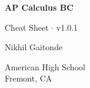 \documentclass[8pt,letter]{extarticle}     %
\theoremstyle{definition}
\theoremstyle{definition}
\theoremstyle{definition}
\begin{document}
\begin{titlepage}
    \begin{center}
		\vspace*{1cm}
		
		\Huge
        \textbf{AP Calculus BC}
        
		\vspace{0.5cm}
		\Large
        Cheat Sheet $\cdot$ v1.0.1
        
        \vfill
        
        Nikhil Gaitonde
        
		\vspace{0.8cm}
		
        American High School\\
        Fremont, CA       
    \end{center}
\end{titlepage}

\begin{multicols}{4}
\setcounter{page}{1}


























\end{multicols}
\end{document}
